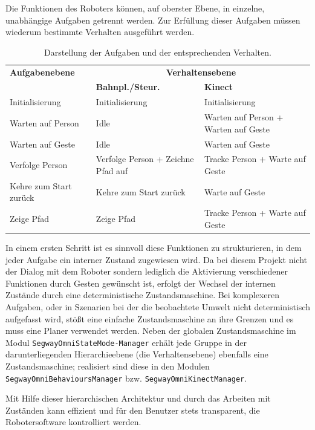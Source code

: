 Die Funktionen des Roboters können, auf oberster Ebene, in einzelne, unabhängige Aufgaben getrennt werden. Zur Erfüllung dieser Aufgaben müssen wiederum bestimmte Verhalten ausgeführt werden.
\begin{table}[h]
	\label{tab:integration_aufgaben}
	\centering
	\begin{tabular}{|p{3.7cm}|p{3cm}|p{3.2cm}|}
	\hline
	\textbf{Aufgabenebene}	&	\multicolumn{2}{c|}{\textbf{Verhaltensebene}}\\
		&	\textbf{Bahnpl./Steur.}	&	\textbf{Kinect}	\\
	\hline
	Initialisierung	&	Initialisierung	&	Initialisierung \\
	\hline
	Warten auf Person	&	Idle	&	Warten auf Person + Warten auf Geste \\
	\hline
	Warten auf Geste	&	Idle	&	Warten auf Geste \\
	\hline
	Verfolge Person	&	Verfolge Person + Zeichne Pfad auf	&	Tracke Person + Warte auf Geste \\
	\hline
	Kehre zum Start zurück	&	Kehre zum Start zurück	&	Warte auf Geste \\
	\hline
	Zeige Pfad	& Zeige Pfad	&	Tracke Person + Warte auf Geste \\
	\hline
	\end{tabular}
	\caption{Darstellung der Aufgaben und der entsprechenden Verhalten.}
\end{table}
In einem ersten Schritt ist es sinnvoll diese Funktionen zu strukturieren, in dem jeder Aufgabe ein 
interner Zustand zugewiesen wird. Da bei diesem Projekt nicht der Dialog mit dem Roboter sondern lediglich 
die Aktivierung verschiedener Funktionen durch Gesten gewünscht ist, erfolgt der Wechsel der internen 
Zustände durch eine deterministische Zustandsmaschine. Bei komplexeren 
Aufgaben, oder in Szenarien bei der die beobachtete Umwelt nicht deterministisch aufgefasst wird, stößt 
eine einfache Zustandsmaschine an ihre Grenzen und es muss eine Planer verwendet werden. 
Neben der globalen Zustandsmaschine im Modul
\lstinline{SegwayOmniStateMode-Manager} erhält jede Gruppe in der darunterliegenden Hierarchieebene (die Verhaltensebene) ebenfalls eine Zustandsmaschine; 
realisiert sind diese in den Modulen \lstinline{SegwayOmniBehavioursManager} bzw. \lstinline{SegwayOmniKinectManager}.

Mit Hilfe dieser hierarchischen Architektur und durch das Arbeiten mit Zuständen kann effizient und für 
den Benutzer stets transparent, die Robotersoftware kontrolliert werden.

